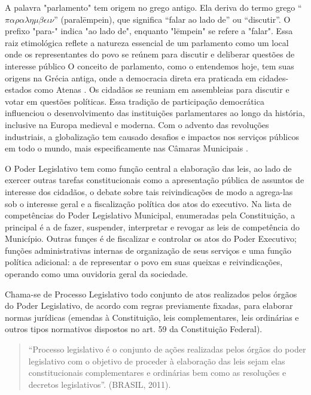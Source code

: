 \documentclass[12pt]{article}
\begin{document}
A palavra "parlamento" tem origem no grego antigo. Ela deriva do termo grego ``$\pi\alpha\rho\alpha\lambda\eta\mu\beta\epsilon\iota\nu$'' (paralēmpein), que significa ``falar ao lado de'' ou ``discutir''. O prefixo "para-" indica "ao lado de", enquanto "lēmpein" se refere a "falar". Essa raiz etimológica reflete a natureza essencial de um parlamento como um local onde os representantes do povo se reúnem para discutir e deliberar questões de interesse público O conceito de parlamento, como o entendemos hoje, tem suas origens na Grécia antiga, onde a democracia direta era praticada em cidades-estados como Atenas \parencite{sathler2016representaccao}. Os cidadãos se reuniam em assembleias para discutir e votar em questões políticas. Essa tradição de participação democrática influenciou o desenvolvimento das instituições parlamentares ao longo da história, inclusive na Europa medieval e moderna. Com o advento das revoluções industriais, a globalização tem causado desafios e impactos nos serviços públicos em todo o mundo, mais especificamente nas Câmaras Municipais \parencite{eirao2013sistema}.
 
O Poder Legislativo tem como função central a elaboração das leis, ao lado de exercer outras tarefas constitucionais como a apresentação pública de assuntos de interesse dos cidadãos, o debate sobre tais reivindicações de modo a agrega-las sob o interesse geral e a fiscalização política dos atos do executivo. Na lista de competências do Poder Legislativo Municipal, enumeradas pela Constituição, a principal é a de fazer, suspender, interpretar e revogar as leis de competência do Município. Outras funçes é de fiscalizar e controlar os atos do Poder Executivo; funções administrativas internas de organização de seus serviços e uma função política adicional: a de representar o povo em suas queixas e reivindicações, operando como uma ouvidoria geral da sociedade.

Chama-se de Processo Legislativo todo conjunto de atos realizados pelos órgãos do Poder Legislativo, de acordo com regras previamente fixadas, para elaborar normas jurídicas (emendas à Constituição, leis complementares, leis ordinárias e outros tipos normativos dispostos no art. 59 da Constituição Federal).  

\begin{quote}
``Processo legislativo é o conjunto de ações realizadas pelos órgãos do poder legislativo com o objetivo de proceder à elaboração das leis sejam elas constitucionais complementares e ordinárias bem como as resoluções e decretos legislativos''. (BRASIL, 2011).
\end{quote}
\end{document}
